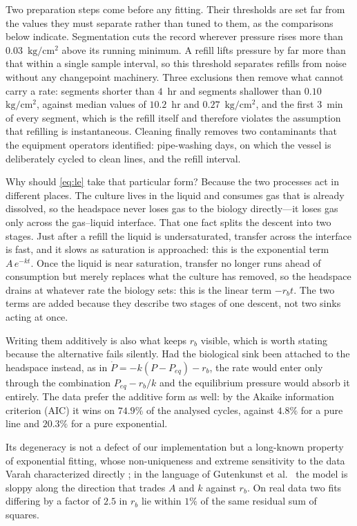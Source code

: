 \documentclass[runningheads]{llncs}
\newcommand{\pu}{\ensuremath{\mathrm{kg/cm^{2}}}}
\newcommand{\rb}{\ensuremath{r_{b}}}
\begin{document}
Two preparation steps come before any fitting. Their thresholds are set
far from the values they must separate rather than tuned to them, as
the comparisons below indicate.
Segmentation cuts the record wherever pressure rises more than
$0.03$~\pu{} above its running minimum. A refill lifts pressure by far
more than that within a single sample interval, so this threshold
separates refills from noise without any changepoint machinery. Three
exclusions then remove what cannot carry a rate: segments shorter than
$4$~hr and segments shallower than $0.10$~\pu{}, against median values
of $10.2$~hr and $0.27$~\pu{}, and the first $3$~min of every segment,
which is the refill itself and therefore violates the assumption that
refilling is instantaneous. Cleaning finally removes two contaminants
that the equipment operators identified: pipe-washing days, on which
the vessel is deliberately cycled to clean lines, and the refill
interval.

Why should \eqref{eq:le} take that particular form? Because the two
processes act in different places. The culture lives in the liquid and
consumes gas that is already dissolved, so the headspace never loses
gas to the biology directly---it loses gas only across the gas--liquid
interface. That one fact splits the descent into two stages. Just after
a refill the liquid is undersaturated, transfer across the interface is
fast, and it slows as saturation is approached: this is the exponential
term $A\,e^{-kt}$. Once the liquid is near saturation, transfer no
longer runs ahead of consumption but merely replaces what the culture
has removed, so the headspace drains at whatever rate the biology sets:
this is the linear term $-\rb t$. The two terms are added because they
describe two stages of one descent, not two sinks acting at once.

Writing them additively is also what keeps \rb{} visible, which is
worth stating because the alternative fails silently. Had the
biological sink been attached to the headspace instead, as in
$\dot{P}=-k(P-P_{eq})-\rb$, the rate would enter only through the
combination $P_{eq}-\rb/k$ and the equilibrium pressure would absorb it
entirely. The data prefer the additive form as well: by the Akaike
information criterion (AIC) it wins on $74.9\%$ of the analysed cycles,
against $4.8\%$ for a pure line and $20.3\%$ for a pure exponential.

Its degeneracy is not a defect of our implementation but a long-known
property of exponential fitting, whose non-uniqueness and extreme
sensitivity to the data Varah characterized
directly \cite{varah1985fitting}; in the language of
Gutenkunst et al.~\cite{gutenkunst2007universally} the model is sloppy
along the direction that trades $A$ and $k$ against \rb{}. On real data
two fits differing by a factor of $2.5$ in \rb{} lie within $1\%$ of the
same residual sum of squares.
\end{document}

